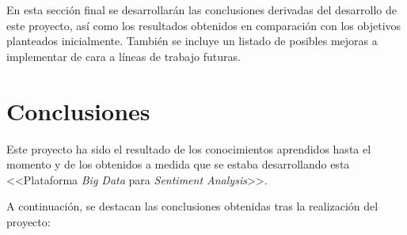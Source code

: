 
En esta sección final se desarrollarán las conclusiones derivadas del desarrollo de este proyecto, así como los resultados obtenidos en comparación con los objetivos planteados inicialmente. También se incluye un listado de posibles mejoras a implementar de cara a líneas de trabajo futuras.

\section{Conclusiones} \label{section:conclusions}

Este proyecto ha sido el resultado de los conocimientos aprendidos hasta el momento y de los obtenidos a medida que se estaba desarrollando esta <<Plataforma \textit{Big Data} para \textit{Sentiment Analysis}>>.

A continuación, se destacan las conclusiones obtenidas tras la realización del proyecto:


